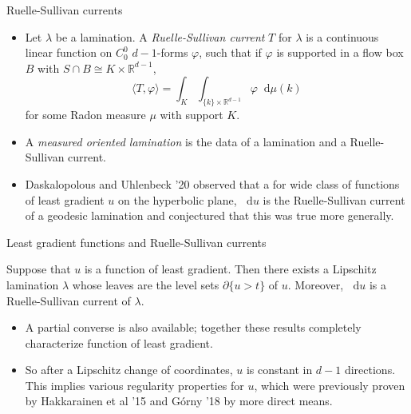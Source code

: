 \documentclass[10pt]{beamer}
\newcommand{\RR}{\mathbb{R}}
\newcommand*\dif{\mathop{}\!\mathrm{d}}
\begin{document}
\begin{frame}{Ruelle-Sullivan currents}
\begin{itemize}
\item Let $\lambda$ be a lamination. A \emph{Ruelle-Sullivan current} $T$ for $\lambda$ is a continuous linear function on $C^0_0$ $d - 1$-forms $\varphi$, such that if $\varphi$ is supported in a flow box $B$ with $S \cap B \cong K \times \RR^{d - 1}$,
$$\langle T, \varphi\rangle = \int_K \int_{\{k\} \times \RR^{d - 1}} \varphi \dif \mu(k)$$
for some Radon measure $\mu$ with support $K$. \pause
\item A \emph{measured oriented lamination} is the data of a lamination and a Ruelle-Sullivan current. \pause
\item Daskalopolous and Uhlenbeck '20 observed that a for wide class of functions of least gradient $u$ on the hyperbolic plane, $\dif u$ is the Ruelle-Sullivan current of a geodesic lamination and conjectured that this was true more generally.
\end{itemize}
\end{frame}

\begin{frame}{Least gradient functions and Ruelle-Sullivan currents}
\begin{theorem}[B '23]
Suppose that $u$ is a function of least gradient. Then there exists a Lipschitz lamination $\lambda$ whose leaves are the level sets $\partial \{u > t\}$ of $u$.
Moreover, $\dif u$ is a Ruelle-Sullivan current of $\lambda$.
\end{theorem} \pause

\begin{itemize}
    \item A partial converse is also available; together these results completely characterize function of least gradient. \pause
    \item So after a Lipschitz change of coordinates, $u$ is constant in $d - 1$ directions. This implies various regularity properties for $u$, which were previously proven by Hakkarainen et al '15 and G\'orny '18 by more direct means.
\end{itemize}

\end{frame}
\end{document}
